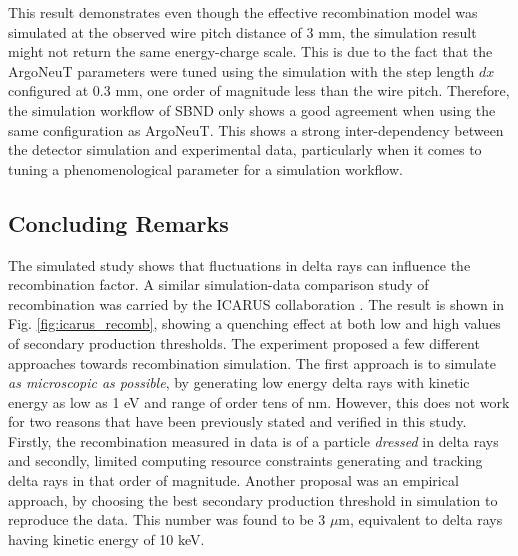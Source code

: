 This result demonstrates even though the effective recombination model was simulated at the observed wire pitch distance of 3 mm, the simulation result might not return the same energy-charge scale.
This is due to the fact that the ArgoNeuT parameters were tuned using the simulation with the step length $dx$ configured at 0.3 mm, one order of magnitude less than the wire pitch.
Therefore, the simulation workflow of SBND only shows a good agreement when using the same configuration as ArgoNeuT. 
This shows a strong inter-dependency between the detector simulation and experimental data, particularly when it comes to tuning a phenomenological parameter for a simulation workflow.

\subsection{Concluding Remarks}

\label{sec:concludeDeltaRay}

The simulated study shows that fluctuations in delta rays can influence the recombination factor.
A similar simulation-data comparison study of recombination was carried by the ICARUS collaboration \cite{icarus_recomb}. 
The result is shown in Fig. \ref{fig:icarus_recomb}, showing a quenching effect at both low and high values of secondary production thresholds.
The experiment proposed a few different approaches towards recombination simulation.
The first approach is to simulate \textit{as microscopic as possible}, by generating low energy delta rays with kinetic energy as low as 1 eV and range of order tens of nm.
However, this does not work for two reasons that have been previously stated and verified in this study.
Firstly, the recombination measured in data is of a particle \textit{dressed} in delta rays and secondly, limited computing resource constraints generating and tracking delta rays in that order of magnitude.
Another proposal was an empirical approach, by choosing the best secondary production threshold in simulation to reproduce the data.
This number was found to be 3 $\mu$m, equivalent to delta rays having kinetic energy of 10 keV.

